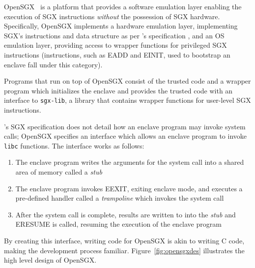 \documentclass[../main.tex]{subfiles}
\begin{document}
OpenSGX~\cite{opensgx} is a platform that provides a
software emulation layer enabling the execution of SGX instructions
\textit{without} the possession of SGX hardware. Specifically, OpenSGX
implements a hardware emulation layer, implementing SGX's instructions
and data structure as per \Intel's specification \footnotemark, and an
OS emulation layer, providing access to wrapper functions for
privileged SGX instructions (instructions, such as EADD and EINIT,
used to bootstrap an enclave fall under this category)\footnotemark.

Programs that run on top of OpenSGX consist of the trusted code and a
wrapper program which initializes the enclave and provides the trusted
code with an interface to \texttt{sgx-lib}, a library that contains
wrapper functions for user-level SGX instructions.

\Intel's SGX specification does not detail how an enclave program may
invoke system calls\footnotemark; OpenSGX specifies an interface which
allows an enclave program to invoke \texttt{libc} functions. The
interface works as follows:

\begin{enumerate}
  \item The enclave program writes the arguments for the system call
    into a shared area of memory called a \textit{stub}
  \item The enclave program invokes EEXIT, exiting enclave mode, and
    executes a pre-defined handler called a \textit{trampoline} which
    invokes the system call
  \item After the system call is complete, results are written to into
    the \textit{stub} and ERESUME is called, resuming the execution of the
    enclave program
\end{enumerate} By creating this interface, writing code for OpenSGX
is akin to writing C code, making the development process
familiar. Figure~\ref{fig:opensgxdes} illustrates the high level
design of OpenSGX.
\end{document}
